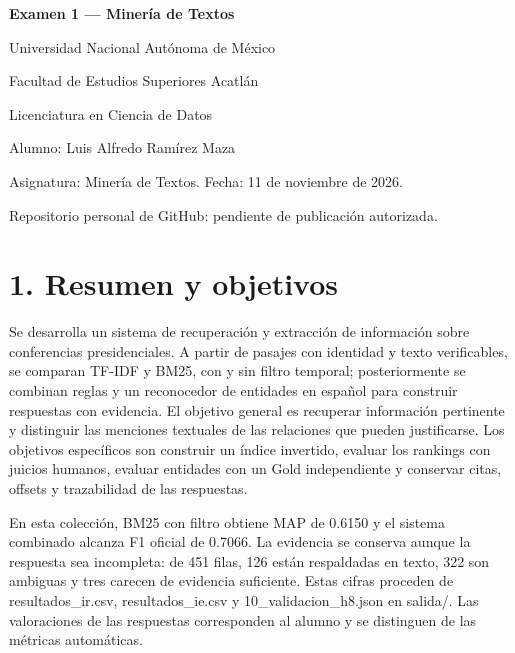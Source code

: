 \documentclass[11pt,a4paper]{article}
\begin{document}
\begin{center}\Large\bfseries Examen 1 — Minería de Textos\end{center}
\par
Universidad Nacional Autónoma de México
\par
Facultad de Estudios Superiores Acatlán
\par
Licenciatura en Ciencia de Datos
\par
Alumno: Luis Alfredo Ramírez Maza
\par
Asignatura: Minería de Textos. Fecha: 11 de noviembre de 2026.
\par
Repositorio personal de GitHub: pendiente de publicación autorizada.
\par
\section*{1. Resumen y objetivos}
\par
Se desarrolla un sistema de recuperación y extracción de información sobre conferencias presidenciales. A partir de pasajes con identidad y texto verificables, se comparan TF-IDF y BM25, con y sin filtro temporal; posteriormente se combinan reglas y un reconocedor de entidades en español para construir respuestas con evidencia. El objetivo general es recuperar información pertinente y distinguir las menciones textuales de las relaciones que pueden justificarse. Los objetivos específicos son construir un índice invertido, evaluar los rankings con juicios humanos, evaluar entidades con un Gold independiente y conservar citas, offsets y trazabilidad de las respuestas.
\par
En esta colección, BM25 con filtro obtiene MAP de 0.6150 y el sistema combinado alcanza F1 oficial de 0.7066. La evidencia se conserva aunque la respuesta sea incompleta: de 451 filas, 126 están respaldadas en texto, 322 son ambiguas y tres carecen de evidencia suficiente. Estas cifras proceden de resultados\_\allowbreak{}ir.csv, resultados\_\allowbreak{}ie.csv y 10\_\allowbreak{}validacion\_\allowbreak{}h8.json en salida/\allowbreak{}. Las valoraciones de las respuestas corresponden al alumno y se distinguen de las métricas automáticas.
\par
\end{document}
